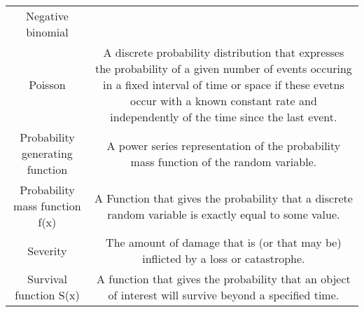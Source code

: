 \documentclass[]{book}
\theoremstyle{definition}
\theoremstyle{definition}
\theoremstyle{definition}
\theoremstyle{remark}
\begin{document}
\begin{longtable}[]{@{}cc@{}}
\begin{minipage}[t]{0.43\columnwidth}\centering\strut
Negative binomial\strut
\end{minipage} & \begin{minipage}[t]{0.43\columnwidth}\centering\strut
\strut
\end{minipage}\tabularnewline
\begin{minipage}[t]{0.43\columnwidth}\centering\strut
Poisson\strut
\end{minipage} & \begin{minipage}[t]{0.43\columnwidth}\centering\strut
A discrete probability distribution that expresses the probability of a
given number of events occuring in a fixed interval of time or space if
these evetns occur with a known constant rate and independently of the
time since the last event.\strut
\end{minipage}\tabularnewline
\begin{minipage}[t]{0.43\columnwidth}\centering\strut
Probability generating function\strut
\end{minipage} & \begin{minipage}[t]{0.43\columnwidth}\centering\strut
A power series representation of the probability mass function of the
random variable.\strut
\end{minipage}\tabularnewline
\begin{minipage}[t]{0.43\columnwidth}\centering\strut
Probability mass function f(x)\strut
\end{minipage} & \begin{minipage}[t]{0.43\columnwidth}\centering\strut
A Function that gives the probability that a discrete random variable is
exactly equal to some value.\strut
\end{minipage}\tabularnewline
\begin{minipage}[t]{0.43\columnwidth}\centering\strut
Severity\strut
\end{minipage} & \begin{minipage}[t]{0.43\columnwidth}\centering\strut
The amount of damage that is (or that may be) inflicted by a loss or
catastrophe.\strut
\end{minipage}\tabularnewline
\begin{minipage}[t]{0.43\columnwidth}\centering\strut
Survival function S(x)\strut
\end{minipage} & \begin{minipage}[t]{0.43\columnwidth}\centering\strut
A function that gives the probability that an object of interest will
survive beyond a specified time.\strut

\end{minipage}
\end{longtable}
\end{document}
